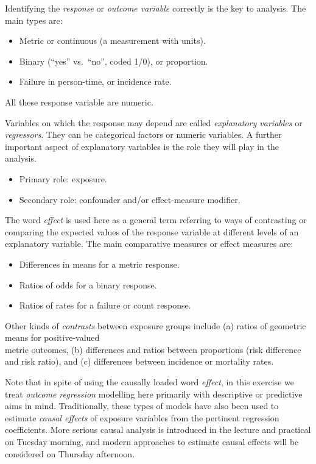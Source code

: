\documentclass[
]{book}
\providecommand{\tightlist}{%
  \setlength{\itemsep}{0pt}\setlength{\parskip}{0pt}}
\begin{document}
Identifying the \emph{response} or \emph{outcome variable} correctly is the key
to analysis. The main types are:

\begin{itemize}
\tightlist
\item
  Metric or continuous (a measurement with units).
\item
  Binary (``yes'' vs.~``no'', coded 1/0), or proportion.
\item
  Failure in person-time, or incidence rate.
\end{itemize}

All these response variable are numeric.

Variables on which the response may depend are called \emph{explanatory
variables} or \emph{regressors}. They can be categorical factors or
numeric variables.
A further important aspect of explanatory variables is the role they
will play in the analysis.

\begin{itemize}
\tightlist
\item
  Primary role: exposure.
\item
  Secondary role: confounder and/or effect-measure modifier.
\end{itemize}

The word \emph{effect}
is used here as a general term referring to ways of
contrasting or comparing the expected values of the response variable at
different levels of an explanatory
variable. The main comparative measures or effect measures are:

\begin{itemize}
\tightlist
\item
  Differences in means for a metric response.
\item
  Ratios of odds for a binary response.
\item
  Ratios of rates for a failure or count response.
\end{itemize}

Other kinds of \emph{contrasts} between exposure groups
include (a) ratios of geometric means for positive-valued\\
metric outcomes,
(b) differences and ratios between proportions
(risk difference and risk ratio), and (c)
differences between incidence or mortality rates.

Note that in spite of using the causally loaded word \emph{effect},
in this exercise we treat \emph{outcome regression} modelling
here primarily with descriptive or predictive aims in mind.
Traditionally, these types of models have also been used
to estimate \emph{causal effects} of exposure variables
from the pertinent regression coefficients.
More serious causal analysis is introduced in the lecture and practical
on Tuesday morning, and modern approaches
to estimate causal effects will be considered
on Thursday afternoon.
\end{document}
